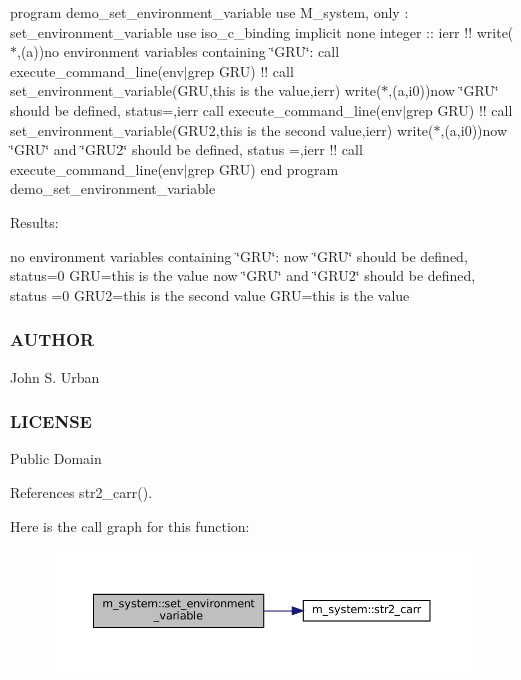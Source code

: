 program demo\+\_\+set\+\_\+environment\+\_\+variable use M\+\_\+system, only \+: set\+\_\+environment\+\_\+variable use iso\+\_\+c\+\_\+binding implicit none integer \+:\+: ierr !! write($\ast$,\textquotesingle{}(a)\textquotesingle{})\textquotesingle{}no environment variables containing \char`\"{}\+G\+R\+U\char`\"{}\+:\textquotesingle{} call execute\+\_\+command\+\_\+line(\textquotesingle{}env$\vert$grep G\+RU\textquotesingle{}) !! call set\+\_\+environment\+\_\+variable(\textquotesingle{}G\+RU\textquotesingle{},\textquotesingle{}this is the value\textquotesingle{},ierr) write($\ast$,\textquotesingle{}(a,i0)\textquotesingle{})\textquotesingle{}now \char`\"{}\+G\+R\+U\char`\"{} should be defined, status=\textquotesingle{},ierr call execute\+\_\+command\+\_\+line(\textquotesingle{}env$\vert$grep G\+RU\textquotesingle{}) !! call set\+\_\+environment\+\_\+variable(\textquotesingle{}G\+R\+U2\textquotesingle{},\textquotesingle{}this is the second value\textquotesingle{},ierr) write($\ast$,\textquotesingle{}(a,i0)\textquotesingle{})\textquotesingle{}now \char`\"{}\+G\+R\+U\char`\"{} and \char`\"{}\+G\+R\+U2\char`\"{} should be defined, status =\textquotesingle{},ierr !! call execute\+\_\+command\+\_\+line(\textquotesingle{}env$\vert$grep G\+RU\textquotesingle{}) end program demo\+\_\+set\+\_\+environment\+\_\+variable

Results\+:

no environment variables containing \char`\"{}\+G\+R\+U\char`\"{}\+: now \char`\"{}\+G\+R\+U\char`\"{} should be defined, status=0 G\+RU=this is the value now \char`\"{}\+G\+R\+U\char`\"{} and \char`\"{}\+G\+R\+U2\char`\"{} should be defined, status =0 G\+R\+U2=this is the second value G\+RU=this is the value \subsubsection*{A\+U\+T\+H\+OR}

John S. Urban \subsubsection*{L\+I\+C\+E\+N\+SE}

Public Domain 

References str2\+\_\+carr().

Here is the call graph for this function\+:\nopagebreak
\begin{figure}[H]
\begin{center}
\leavevmode
\includegraphics[width=350pt]{namespacem__system_ad813765403a5d9d6fb7a2edcb669fe4b_cgraph}
\end{center}
\end{figure}
\mbox{\label{namespacem__system_a58bb591b5b9fefec3960a28361aae07a}} 

